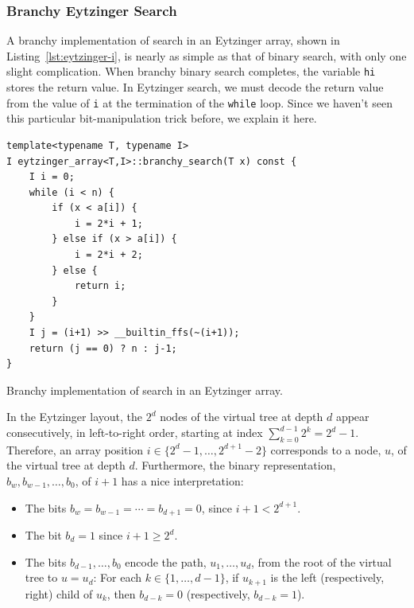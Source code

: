 \documentclass{patmorin}
\newcommand{\lstlabel}[1]{\label{lst:#1}}
\newcommand{\lstref}[1]{Listing~\ref{lst:#1}}
\begin{document}
\subsubsection{Branchy Eytzinger Search}

A branchy implementation of search in an Eytzinger array, shown in
\lstref{eytzinger-i}, is nearly as simple as that of binary search, with
only one slight complication. When branchy binary search completes, the
variable \texttt{hi} stores the return value. In Eytzinger search,
we must decode the return value from the value of \texttt{i}
at the termination of the \texttt{while} loop.  Since we haven't seen
this particular bit-manipulation trick before, we explain it here.


\begin{listing}
\begin{verbatim}
template<typename T, typename I>
I eytzinger_array<T,I>::branchy_search(T x) const {
    I i = 0;
    while (i < n) {
        if (x < a[i]) {
            i = 2*i + 1;
        } else if (x > a[i]) {
            i = 2*i + 2;
        } else {
            return i;
        }
    }
    I j = (i+1) >> __builtin_ffs(~(i+1));
    return (j == 0) ? n : j-1;
}
\end{verbatim}
\caption{Branchy implementation of search in an Eytzinger array.}
\lstlabel{eytzinger-i}
\end{listing}

In the Eytzinger layout, the $2^d$ nodes of the virtual tree at depth $d$
appear consecutively, in left-to-right order, starting at index
$\sum_{k=0}^{d-1}2^k = 2^d-1$.  Therefore, an array position
$i\in\{2^d-1,\ldots,2^{d+1}-2\}$ corresponds to a node, $u$, of the
virtual tree at depth $d$. Furthermore, the binary representation,
$b_w,b_{w-1},\ldots,b_0$, of $i+1$ has a nice interpretation:

\begin{itemize}
  \item The bits $b_w=b_{w-1}=\cdots=b_{d+1}=0$, since $i+1 < 2^{d+1}$.
  \item The bit $b_d=1$ since $i+1\ge 2^d$.
  \item The bits $b_{d-1},\ldots,b_{0}$ encode the path,
    $u_1,\ldots,u_{d}$, from the root of the virtual tree to
    $u=u_{d}$: For each $k\in\{1,\ldots,d-1\}$, if $u_{k+1}$ is the left
    (respectively, right) child of $u_k$, then $b_{d-k}=0$ (respectively,
    $b_{d-k}=1$).
\end{itemize}
\end{document}
